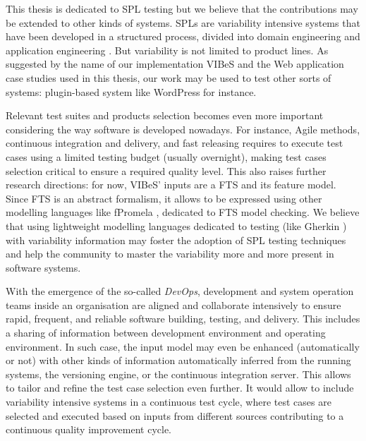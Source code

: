 This thesis is dedicated to \gls{SPL} testing but we believe that the contributions may be extended to other kinds of systems. \glspl{SPL} are variability intensive systems that have been developed in a structured process, divided into domain engineering and application engineering \cite{Pohl2005}. But variability is not limited to product lines. As suggested by the name of our implementation \acrfull{VIBeS} and the Web application case studies used in this thesis, our work may be used to test other sorts of systems: plugin-based system like WordPress for instance. 

Relevant test suites and products selection becomes even more important considering the way software is developed nowadays. For instance, Agile methods, continuous integration and delivery, and fast releasing requires to execute test cases using a limited testing budget (usually overnight), making test cases selection critical to ensure a required quality level. This also raises further research directions: for now, VIBeS' inputs are a FTS and its feature model. Since FTS is an abstract formalism, it allows to be expressed using other modelling languages like fPromela \cite{Classen2013b}, dedicated to FTS model checking. We believe that using lightweight modelling languages dedicated to testing (like Gherkin \cite{cucumber}) with variability information may foster the adoption of SPL testing techniques and help the community to master the variability more and more present in software systems. 

With the emergence of the so-called \textit{DevOps}, development and system operation teams inside an organisation are aligned and collaborate intensively to ensure rapid, frequent, and reliable software building, testing, and delivery. This includes a sharing of information between development environment and operating environment. In such case, the input model may even be enhanced (automatically or not) with other kinds of information automatically inferred from the running systems, the versioning engine, or the continuous integration server. This allows to tailor and refine the test case selection even further. It would allow to include variability intensive systems in a continuous test cycle, where test cases are selected and executed based on inputs from different sources contributing to a continuous quality improvement cycle.

